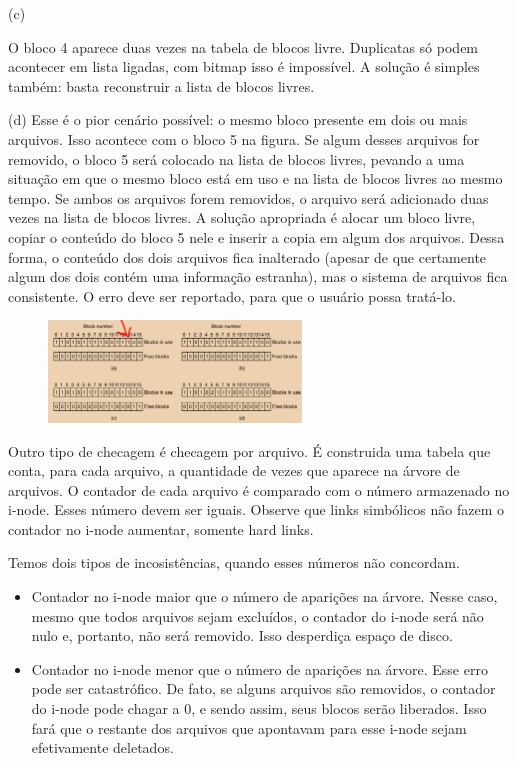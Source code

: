 \documentclass{article}
\begin{document}
{\color{blue} (c)}

O bloco 4 aparece duas vezes na tabela de blocos livre. Duplicatas só podem acontecer em lista ligadas, com bitmap isso é impossível. A solução é simples também: basta reconstruir a lista de blocos livres.



{\color{blue} (d)}
Esse é o pior cenário possível: o mesmo bloco presente em dois ou mais arquivos. Isso acontece com o bloco 5 na figura. Se algum desses arquivos for removido, o bloco 5 será colocado na lista de blocos livres, pevando a uma situação em que o mesmo bloco está em uso e na lista de blocos livres ao mesmo tempo. Se ambos os arquivos forem removidos, o arquivo será adicionado duas vezes na lista de blocos livres. A solução apropriada é alocar um bloco livre, copiar o conteúdo do bloco 5 nele e inserir a copia em algum dos arquivos. Dessa forma, o conteúdo dos dois arquivos fica inalterado (apesar de que certamente algum dos dois contém uma informação estranha), mas o sistema de arquivos fica consistente. O erro deve ser reportado, para que o usuário possa tratá-lo.

\begin{figure}[h]
  \begin{center}
    \includegraphics[width=0.6\textwidth]{img/5-19.png}
  \end{center}
  \caption{}
  \label{fig:}
\end{figure}


Outro tipo de checagem é checagem por arquivo. É construida uma tabela que conta, para cada arquivo, a quantidade de vezes que aparece na árvore de arquivos. O contador de cada arquivo é comparado com o número armazenado no i-node. Esses número devem ser iguais. Observe que links simbólicos não fazem o contador no i-node aumentar, somente hard links.

Temos dois tipos de incosistências, quando esses números não concordam.

\begin{itemize}
  \item Contador no i-node maior que o número de aparições na árvore. Nesse caso, mesmo que todos arquivos sejam excluídos, o contador do i-node será não nulo e, portanto, não será removido. Isso desperdiça espaço de disco.   \item Contador no i-node menor que o número de aparições na árvore. Esse erro pode ser catastrófico. De fato, se alguns arquivos são removidos, o contador do i-node pode chagar a 0, e sendo assim, seus blocos serão liberados. Isso fará que o restante dos arquivos que apontavam para esse i-node sejam efetivamente deletados. 
\end{itemize}
\end{document}
